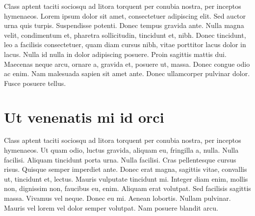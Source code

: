 Class aptent taciti sociosqu ad litora torquent per conubia nostra, per inceptos hymenaeos. Lorem ipsum dolor sit amet, consectetuer adipiscing elit. Sed auctor urna quis turpis. Suspendisse potenti. Donec tempus gravida ante. Nulla magna velit, condimentum et, pharetra sollicitudin, tincidunt et, nibh. Donec tincidunt, leo a facilisis consectetuer, quam diam cursus nibh, vitae porttitor lacus dolor in lacus. Nulla id nulla in dolor adipiscing posuere. Proin sagittis mattis dui. Maecenas neque arcu, ornare a, gravida et, posuere ut, massa. Donec congue odio ac enim. Nam malesuada sapien sit amet ante. Donec ullamcorper pulvinar dolor. Fusce posuere tellus.

\section{Ut venenatis mi id orci}

Class aptent taciti sociosqu ad litora torquent per conubia nostra, per inceptos hymenaeos. Ut quam odio, luctus gravida, aliquam eu, fringilla a, nulla. Nulla facilisi. Aliquam tincidunt porta urna. Nulla facilisi. Cras pellentesque cursus risus. Quisque semper imperdiet ante. Donec erat magna, sagittis vitae, convallis ut, tincidunt et, lectus. Mauris vulputate tincidunt mi. Integer diam enim, mollis non, dignissim non, faucibus eu, enim. Aliquam erat volutpat. Sed facilisis sagittis massa. Vivamus vel neque. Donec eu mi. Aenean lobortis. Nullam pulvinar. Mauris vel lorem vel dolor semper volutpat. Nam posuere blandit arcu.

\endinput
